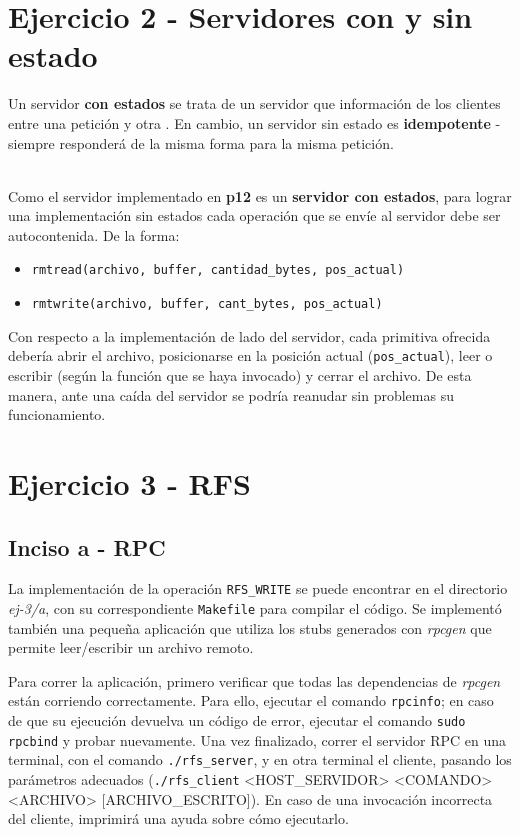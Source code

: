 \section{Ejercicio 2 - Servidores con y sin estado}

Un servidor \textbf{con estados} se trata de un servidor que  información de los clientes entre una petición y otra \autocite{StatefulStateless}. En cambio, un servidor sin estado es \textbf{idempotente} - siempre responderá de la misma forma para la misma petición. 

~\\

Como el servidor implementado en \textbf{p12} es un \textbf{servidor con estados}, para lograr una implementación sin estados cada operación que se envíe al servidor debe ser autocontenida. De la forma:

\begin{itemize}
    \item \texttt{rmtread(archivo, buffer, cantidad\_bytes, pos\_actual)} 
    \item \texttt{rmtwrite(archivo, buffer, cant\_bytes, pos\_actual)} 
\end{itemize}

Con respecto a la implementación de lado del servidor, cada primitiva ofrecida debería abrir el archivo, posicionarse en la posición actual (\texttt{pos\_actual}), leer o escribir (según la función que se haya invocado) y cerrar el archivo. De esta manera, ante una caída del servidor se podría reanudar sin problemas su funcionamiento.



\section{Ejercicio 3 - RFS}

\subsection{Inciso a - RPC}

La implementación de la operación \texttt{RFS\_WRITE} se puede encontrar en el directorio \emph{ej-3/a}, con su correspondiente \texttt{Makefile} para compilar el código. Se implementó también una pequeña aplicación que utiliza los stubs generados con \emph{rpcgen} que permite leer/escribir un archivo remoto.

Para correr la aplicación, primero verificar que todas las dependencias de \emph{rpcgen} están corriendo correctamente. Para ello, ejecutar el comando \texttt{rpcinfo}; en caso de que su ejecución devuelva un código de error, ejecutar el comando \texttt{sudo rpcbind} y probar nuevamente. Una vez finalizado, correr el servidor RPC en una terminal, con el comando \texttt{./rfs\_server}, y en otra terminal el cliente, pasando los parámetros adecuados (\texttt{./rfs\_client} <HOST\_SERVIDOR> <COMANDO> <ARCHIVO> [ARCHIVO\_ESCRITO]). En caso de una invocación incorrecta del cliente, imprimirá una ayuda sobre cómo ejecutarlo.

